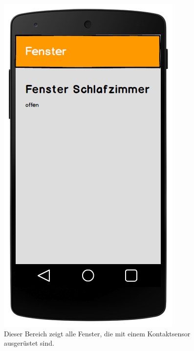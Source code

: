 \begin{figure}[H]
	\centering
		\includegraphics[scale=0.3]{report/img/mockup_window.png}
	\caption{Dieser Bereich zeigt alle Fenster, die mit einem Kontaktsensor ausgerüstet sind.}
	\label{fig:mockupWindow}
\end{figure}

